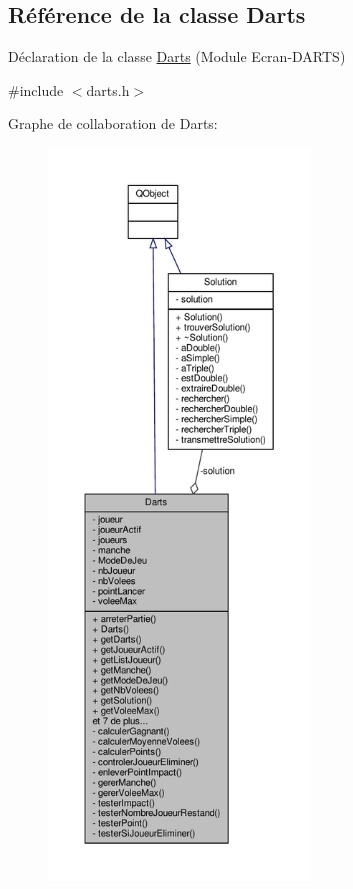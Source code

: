\hypertarget{class_darts}{}\subsection{Référence de la classe Darts}
\label{class_darts}


Déclaration de la classe \hyperlink{class_darts}{Darts} (Module Ecran-\/\+D\+A\+R\+TS)  




{\ttfamily \#include $<$darts.\+h$>$}



Graphe de collaboration de Darts\+:
\nopagebreak
\begin{figure}[H]
\begin{center}
\leavevmode
\includegraphics[height=550pt]{class_darts__coll__graph}
\end{center}
\end{figure}
